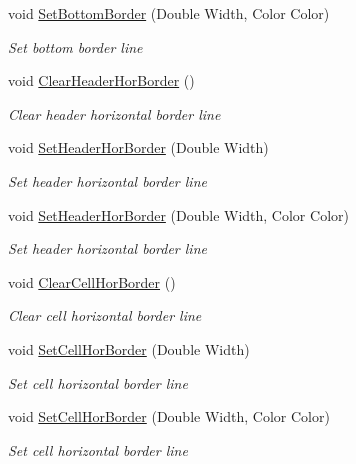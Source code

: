 \begin{DoxyCompactItemize}
void \hyperlink{class_pdf_file_writer_1_1_pdf_table_border_a5006a6cd46e4437839d88b4acba84070}{Set\+Bottom\+Border} (Double Width, Color Color)
\begin{DoxyCompactList}\small\item\em Set bottom border line \end{DoxyCompactList}\item 
void \hyperlink{class_pdf_file_writer_1_1_pdf_table_border_ab0c44217e86293af3abfd047b9fa2df7}{Clear\+Header\+Hor\+Border} ()
\begin{DoxyCompactList}\small\item\em Clear header horizontal border line \end{DoxyCompactList}\item 
void \hyperlink{class_pdf_file_writer_1_1_pdf_table_border_a5f09a17e338685b2bac12d339bf97c73}{Set\+Header\+Hor\+Border} (Double Width)
\begin{DoxyCompactList}\small\item\em Set header horizontal border line \end{DoxyCompactList}\item 
void \hyperlink{class_pdf_file_writer_1_1_pdf_table_border_ab110f1df12338fc7cd67153c3a8bff83}{Set\+Header\+Hor\+Border} (Double Width, Color Color)
\begin{DoxyCompactList}\small\item\em Set header horizontal border line \end{DoxyCompactList}\item 
void \hyperlink{class_pdf_file_writer_1_1_pdf_table_border_a4d0fb9eeb891f9c36e0ac59837a21c7a}{Clear\+Cell\+Hor\+Border} ()
\begin{DoxyCompactList}\small\item\em Clear cell horizontal border line \end{DoxyCompactList}\item 
void \hyperlink{class_pdf_file_writer_1_1_pdf_table_border_ac44389ecafc3471ed80a45369c53e6ae}{Set\+Cell\+Hor\+Border} (Double Width)
\begin{DoxyCompactList}\small\item\em Set cell horizontal border line \end{DoxyCompactList}\item 
void \hyperlink{class_pdf_file_writer_1_1_pdf_table_border_abb14e5d57c074c54bb9bf065a9d44b31}{Set\+Cell\+Hor\+Border} (Double Width, Color Color)
\begin{DoxyCompactList}\small\item\em Set cell horizontal border line \end{DoxyCompactList}\item 

\end{DoxyCompactItemize}
